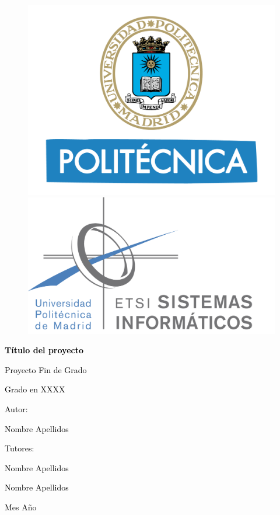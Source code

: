 \documentclass[a4paper]{report}
\begin{document}
\begin{titlepage}
\pagecolor{AzulPortada}\afterpage{\nopagecolor}

\begin{figure}[!htb]
   \begin{minipage}{0.45\textwidth}
     \centering
     \includegraphics[width=1\textwidth]{logo_upm.png}
   \end{minipage}\hfill
   \begin{minipage}{0.45\textwidth}
     \centering
     \includegraphics[width=1\textwidth]{logo_etsisi.png}
   \end{minipage}
\end{figure}

{\bfseries\Huge \textcolor{black}{Título del proyecto} \par}
\vfill
{\huge \textcolor{black}{Proyecto Fin de Grado} \par}
\vfill
{\huge \textcolor{black}{Grado en XXXX} \par}
\vfill
{\huge \textcolor{black}{Autor:} \par}
{\huge \textcolor{black}{Nombre Apellidos} \par}
\vfill
{\huge \textcolor{black}{Tutores:} \par}
{\huge \textcolor{black}{Nombre Apellidos} \par}
{\huge \textcolor{black}{Nombre Apellidos} \par}
\vfill
{\huge \textcolor{black}{Mes Año} \par}
\newpage


\end{titlepage}
\end{document}
